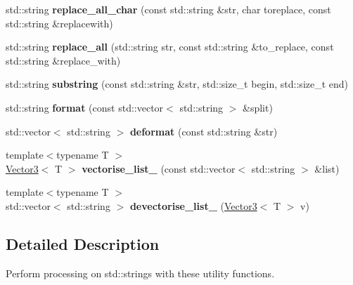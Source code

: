 \begin{DoxyCompactItemize}
\item 
\mbox{\label{namespacetz_1_1util_1_1string_a754d2ba5c06962dcce54fd88c20eb44c}} 
std\+::string {\bfseries replace\+\_\+all\+\_\+char} (const std\+::string \&str, char toreplace, const std\+::string \&replacewith)
\item 
\mbox{\label{namespacetz_1_1util_1_1string_a724fdb88fd3bc3f47861b316ff29f93b}} 
std\+::string {\bfseries replace\+\_\+all} (std\+::string str, const std\+::string \&to\+\_\+replace, const std\+::string \&replace\+\_\+with)
\item 
\mbox{\label{namespacetz_1_1util_1_1string_a56172e6a9438e266c85b2d6b6f07ada7}} 
std\+::string {\bfseries substring} (const std\+::string \&str, std\+::size\+\_\+t begin, std\+::size\+\_\+t end)
\item 
\mbox{\label{namespacetz_1_1util_1_1string_a6490a647a538e71ee68ac82288f46e8a}} 
std\+::string {\bfseries format} (const std\+::vector$<$ std\+::string $>$ \&split)
\item 
\mbox{\label{namespacetz_1_1util_1_1string_a1bce2252d670d54953f43951cf95c17c}} 
std\+::vector$<$ std\+::string $>$ {\bfseries deformat} (const std\+::string \&str)
\item 
\mbox{\label{namespacetz_1_1util_1_1string_a43ab2bd5eb60aea425868b1775e35061}} 
{\footnotesize template$<$typename T $>$ }\\\mbox{\hyperlink{class_vector3}{Vector3}}$<$ T $>$ {\bfseries vectorise\+\_\+list\+\_} (const std\+::vector$<$ std\+::string $>$ \&list)
\item 
\mbox{\label{namespacetz_1_1util_1_1string_ae41719b325e61db27cb0eeec76e39653}} 
{\footnotesize template$<$typename T $>$ }\\std\+::vector$<$ std\+::string $>$ {\bfseries devectorise\+\_\+list\+\_} (\mbox{\hyperlink{class_vector3}{Vector3}}$<$ T $>$ v)
\end{DoxyCompactItemize}


\subsection{Detailed Description}
Perform processing on std\+::strings with these utility functions. 